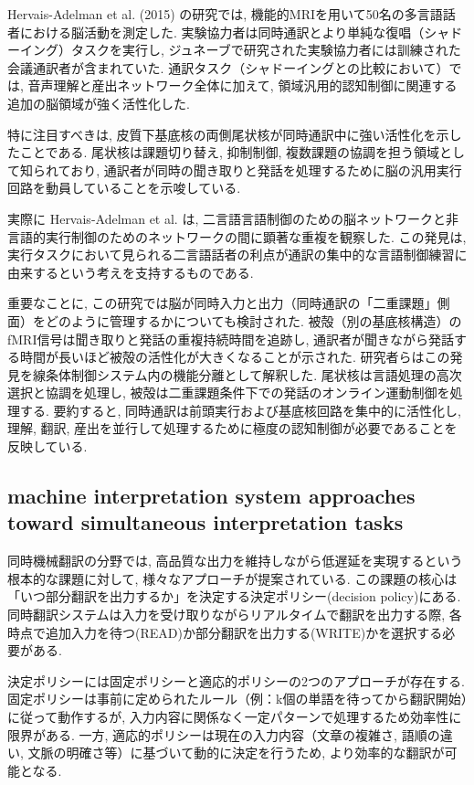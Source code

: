 Hervais-Adelman et al. (2015) の研究では, 機能的MRIを用いて50名の多言語話者における脳活動を測定した. 
実験協力者は同時通訳とより単純な復唱（シャドーイング）タスクを実行し, ジュネーブで研究された実験協力者には訓練された会議通訳者が含まれていた. 
通訳タスク（シャドーイングとの比較において）では, 音声理解と産出ネットワーク全体に加えて, 領域汎用的認知制御に関連する追加の脳領域が強く活性化した.

特に注目すべきは, 皮質下基底核の両側尾状核が同時通訳中に強い活性化を示したことである. 
尾状核は課題切り替え, 抑制制御, 複数課題の協調を担う領域として知られており, 通訳者が同時の聞き取りと発話を処理するために脳の汎用実行回路を動員していることを示唆している.

実際に Hervais-Adelman et al. は, 二言語言語制御のための脳ネットワークと非言語的実行制御のためのネットワークの間に顕著な重複を観察した. 
この発見は, 実行タスクにおいて見られる二言語話者の利点が通訳の集中的な言語制御練習に由来するという考えを支持するものである.

重要なことに, この研究では脳が同時入力と出力（同時通訳の「二重課題」側面）をどのように管理するかについても検討された. 
被殻（別の基底核構造）のfMRI信号は聞き取りと発話の重複持続時間を追跡し, 通訳者が聞きながら発話する時間が長いほど被殻の活性化が大きくなることが示された.
研究者らはこの発見を線条体制御システム内の機能分離として解釈した. 尾状核は言語処理の高次選択と協調を処理し, 被殻は二重課題条件下での発話のオンライン運動制御を処理する. 
要約すると, 同時通訳は前頭実行および基底核回路を集中的に活性化し, 理解, 翻訳, 産出を並行して処理するために極度の認知制御が必要であることを反映している.

\subsection{machine interpretation system approaches toward simultaneous interpretation tasks}

同時機械翻訳の分野では, 高品質な出力を維持しながら低遅延を実現するという根本的な課題に対して, 様々なアプローチが提案されている.
この課題の核心は「いつ部分翻訳を出力するか」を決定する決定ポリシー(decision policy)にある.
同時翻訳システムは入力を受け取りながらリアルタイムで翻訳を出力する際, 各時点で追加入力を待つ(READ)か部分翻訳を出力する(WRITE)かを選択する必要がある.

決定ポリシーには固定ポリシーと適応的ポリシーの2つのアプローチが存在する.
固定ポリシーは事前に定められたルール（例：k個の単語を待ってから翻訳開始）に従って動作するが, 入力内容に関係なく一定パターンで処理するため効率性に限界がある.
一方, 適応的ポリシーは現在の入力内容（文章の複雑さ, 語順の違い, 文脈の明確さ等）に基づいて動的に決定を行うため, より効率的な翻訳が可能となる.

